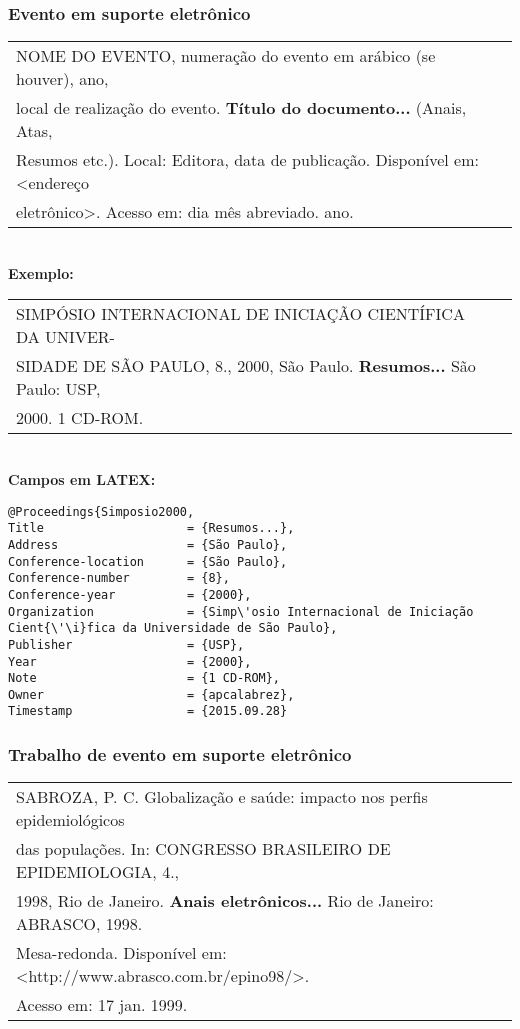 \subsubsection{Evento em suporte eletrônico} 

\begin{tabular}{|l|c|} \hline
	NOME DO EVENTO, numeração do evento em arábico (se
	houver), ano, \\local de realização do evento. \textbf{Título do
	documento...} (Anais, Atas, \\Resumos etc.). Local: Editora, data de publicação. Disponível em: <endereço \\eletrônico>. Acesso em: dia mês abreviado. ano. 
	\\\hline
\end{tabular} \\

\textbf{Exemplo:} \\

\begin{tabular}{|l|c|} \hline
	SIMPÓSIO INTERNACIONAL DE INICIAÇÃO CIENTÍFICA DA
	UNIVER-\\SIDADE DE SÃO PAULO, 8., 2000, São Paulo. \textbf{Resumos...}
	São Paulo: USP, \\2000. 1 CD-ROM.  \\\hline
\end{tabular} \\

\textbf{Campos em LATEX:} 

\begin{verbatim}
@Proceedings{Simposio2000,
Title                    = {Resumos...},
Address                  = {São Paulo},
Conference-location      = {São Paulo},
Conference-number        = {8},
Conference-year          = {2000},
Organization             = {Simp\'osio Internacional de Iniciação 
Cient{\'\i}fica da Universidade de São Paulo},
Publisher                = {USP},
Year                     = {2000},
Note                     = {1 CD-ROM},
Owner                    = {apcalabrez},
Timestamp                = {2015.09.28}
\end{verbatim}

\subsubsection{Trabalho de evento em suporte eletrônico }

\begin{tabular}{|l|c|} \hline
SABROZA, P. C. Globalização e saúde: impacto nos perfis
epidemiológicos \\das populações. In: CONGRESSO BRASILEIRO DE
EPIDEMIOLOGIA, 4., \\1998, Rio de Janeiro. \textbf{Anais eletrônicos...} Rio de
Janeiro: ABRASCO, 1998. \\Mesa-redonda. Disponível em:
<http://www.abrasco.com.br/epino98/>. \\Acesso em: 17 jan. 1999.\\\hline 
\end{tabular} \\

